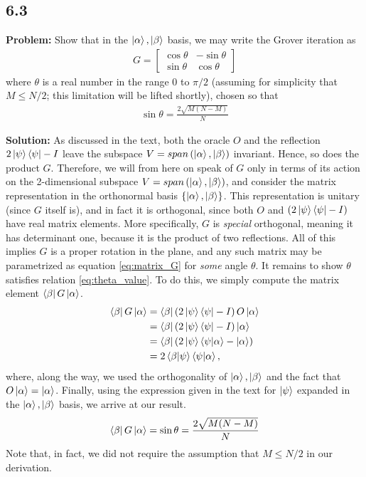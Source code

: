 \documentclass{article}
\begin{document}
\subsection*{6.3}
\textbf{Problem:} Show that in the $\ket{\alpha}, \ket{\beta}$ basis, we may write the Grover iteration as
\begin{align}
    G = 
    \begin{bmatrix} \label{eq:matrix_G}
        \cos\theta & -\sin\theta \\
        \sin\theta & \cos\theta
    \end{bmatrix}
\end{align}
where $\theta$ is a real number in the range 0 to $\pi/2$ (assuming for simplicity that $M\leq N/2$; this limitation will be lifted shortly), chosen so that
\begin{align} \label{eq:theta_value}
    \sin\theta =\frac{2\sqrt{M(N-M)}}{N}
\end{align}

\textbf{Solution:} As discussed in the text, both the oracle $O$ and the reflection $2\ket{\psi}\bra{\psi}-I$ leave the subspace $V = span\left(\ket{\alpha},\ket{\beta}\right)$ invariant. Hence, so does the product $G$. Therefore, we will from here on speak of $G$ only in terms of its action on the 2-dimensional subspace $V = span\left(\ket{\alpha},\ket{\beta}\right)$, and consider the matrix representation in the orthonormal basis $\{\ket{\alpha},\ket{\beta}\}$. This representation is unitary (since $G$ itself is), and in fact it is orthogonal, since both $O$ and $(2\ket{\psi}\bra{\psi}-I)$ have real matrix elements. More specifically, $G$ is \emph{special} orthogonal, meaning it has determinant one, because it is the product of two reflections. All of this implies $G$ is a proper rotation in the plane, and any such matrix may be parametrized as equation \eqref{eq:matrix_G} for \emph{some} angle $\theta$. It remains to show $\theta$ satisfies relation \eqref{eq:theta_value}. To do this, we simply compute the matrix element $\bra{\beta}G\ket{\alpha}$.
\begin{align}
\begin{aligned}
    \bra{\beta}G\ket{\alpha} &= \bra{\beta}\left(2\ket{\psi}\bra{\psi}-I\right)O\ket{\alpha} \\
    &=\bra{\beta}\left(2\ket{\psi}\bra{\psi}-I\right)\ket{\alpha}\\
    &=\bra{\beta}\left(2\ket{\psi}\braket{\psi}{\alpha}-\ket{\alpha}\right) \\
    &=2\braket{\beta}{\psi}\braket{\psi}{\alpha},
\end{aligned}
\end{align}
where, along the way, we used the orthogonality of $\ket{\alpha},\ket{\beta}$ and the fact that $O\ket{\alpha} = \ket{\alpha}$. Finally, using the expression given in the text for $\ket{\psi}$ expanded in the $\ket{\alpha},\ket{\beta}$ basis, we arrive at our result. 
\begin{align}
    \bra{\beta}G\ket{\alpha} = \sin\theta = \frac{2\sqrt{M(N-M)}}{N}
\end{align}
Note that, in fact, we did not require the assumption that $M\leq N/2$ in our derivation.
\end{document}
